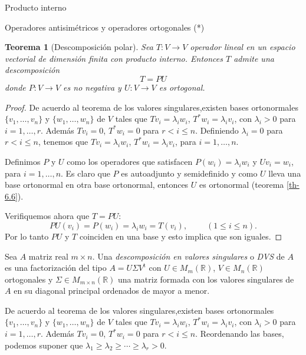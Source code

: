 \documentclass[a4paper,12pt,twoside,spanish,reqno]{amsbook}
\numberwithin{equation}{section}
\newtheorem{teorema}{Teorema}[section]
\theoremstyle{definition}
\theoremstyle{remark}
\renewcommand{\t}{{\operatorname{t}}}
\newcommand{\R}{\mathbb R}
\begin{document}
\begin{chapter}{Producto interno}
\begin{section}{Operadores antisimétricos y operadores ortogonales (*)}
        \begin{teorema}[Descomposición polar] Sea $T: V \to V$ operador lineal en un espacio vectorial de dimensión finita con producto interno. Entonces $T$  admite una descomposición
            $$
            T = PU
            $$
            donde $P:V \to V$ es no negativa y $U: V \to V$  es ortogonal.
        \end{teorema}
        \begin{proof}
        De acuerdo al teorema de los valores singulares,existen bases ortonormales $\{v_1,\ldots,v_n\}$ y $\{w_1,\ldots,w_n\}$  de $V$ tales que $Tv_i = \lambda_i w_i$,  $T^*w_i = \lambda_i v_i$, con $\lambda_i >0$ para $i=1,\ldots,r$. Además $Tv_i = 0$,  $T^*w_i = 0$ para $r < i \le n$. Definiendo $\lambda_i =0$ para $r < i \le n$,  tenemos que $Tv_i = \lambda_i w_i$,  $T^*w_i = \lambda_i v_i$, para $i=1,\ldots,n$.
        
        Definimos $P$ y $U$ como los operadores que satisfacen $P(w_i) = \lambda_i w_i$ y $Uv_i = w_i$, para $i=1,\ldots,n$. Es claro que $P$ es autoadjunto y semidefinido y como $U$ lleva una base ortonormal en otra base ortonormal,  entonces $U$  es ortonormal (teorema \ref{th-6.6}).
        
        Verifiquemos ahora que $T =PU$: 
        $$
        PU(v_i) = P(w_i) = \lambda_i w_i = T(v_i), \;\qquad(1 \le i \le n).
        $$ 
        Por lo tanto  $PU$ y $T$ coinciden en una base y esto implica que son iguales.
         
        \end{proof}
        
        
        Sea $A$ matriz real $m \times n$. Una \textit{descomposición en valores singulares} o \textit{DVS} de $A$ es una factorización del tipo $A = U \Sigma V^{\t}$ con $U \in M_{m}(\R)$, $V \in M_{n}(\R)$ ortogonales y $\Sigma \in M_{m \times n}(\R)$ una matriz formada con los valores singulares de $A$ en su diagonal principal ordenados de mayor a menor.
        
        De acuerdo al teorema de los valores singulares,existen bases ortonormales $\{v_1,\ldots,v_n\}$ y $\{w_1,\ldots,w_n\}$  de $V$ tales que $Tv_i = \lambda_i w_i$,  $T^*w_i = \lambda_i v_i$, con $\lambda_i >0$ para $i=1,\ldots,r$. Además $Tv_i = 0$,  $T^*w_i = 0$ para $r < i \le n$. Reordenando las bases, podemos suponer que $\lambda_1 \ge \lambda_{2} \ge \cdots \ge \lambda_{r}>0$. 
        

\end{section}
\end{chapter}
\end{document}
